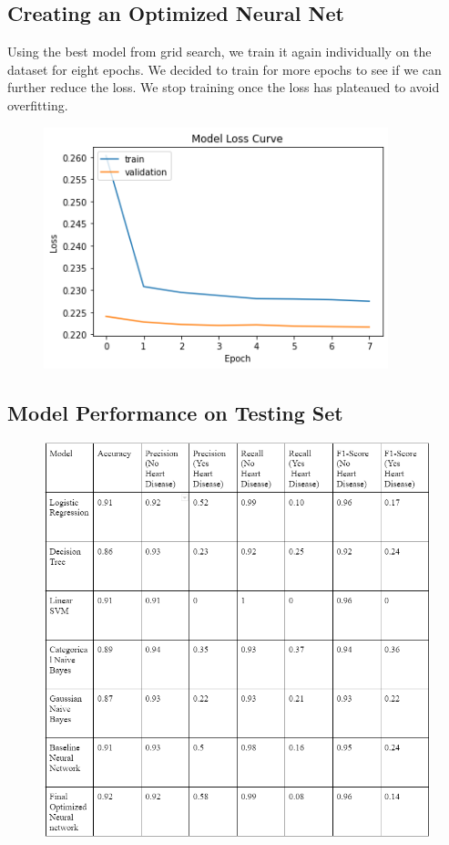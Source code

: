 \documentclass[a4paper]{article}
\begin{document}
\subsection{Creating an Optimized Neural Net}

Using the best model from grid search, we train it again individually on the dataset for eight epochs. We decided to train for more epochs to see if we can further reduce the loss. We stop training once the loss has plateaued to avoid overfitting.

\begin{figure}[H]
    \centering
    \includegraphics[width=10cm]{images/modellosscurve.png}
\end{figure}

\subsection{Model Performance on Testing Set}

\begin{figure}[H]
    \centering
    \includegraphics[width=12cm]{images/classificationreport.png}
\end{figure}
\end{document}
